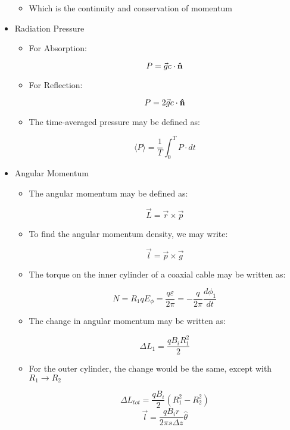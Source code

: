 \begin{itemize}
\begin{itemize}
      \item Which is the continuity and conservation of momentum

    \end{itemize}

  \item Radiation Pressure

    \begin{itemize}

      \item For Absorption:

        $$P=\vec{g}c\cdot\bold{\hat{n}}$$

      \item For Reflection:

        $$P=2\vec{g}c\cdot\bold{\hat{n}}$$

      \item The time-averaged pressure may be defined as:

        $$\langle P\rangle=\frac{1}{T}\int_0^TP\cdot dt$$

    \end{itemize}

  \item Angular Momentum

    \begin{itemize}

      \item The angular momentum may be defined as:

        $$\vec{L}=\vec{r}\times\vec{p}$$

      \item To find the angular momentum density, we may write:

        $$\vec{l}=\vec{p}\times\vec{g}$$

      \item The torque on the inner cylinder of a coaxial cable may be written as:

        $$N=R_1qE_{\phi}=\frac{q\varepsilon}{2\pi}=-\frac{q}{2\pi}\frac{d\phi_1}{dt}$$

      \item The change in angular momentum may be written as:

        $$\Delta L_1=\frac{qB_iR_1^2}{2}$$

      \item For the outer cylinder, the change would be the same, except with $R_1\to R_2$

        $$\Delta L_{tot}=\frac{qB_i}{2}(R_1^2-R_2^2)$$
        $$\vec{l}=\frac{qB_i r}{2\pi s\Delta z}\hat{\theta}$$

    \end{itemize}

\end{itemize}



